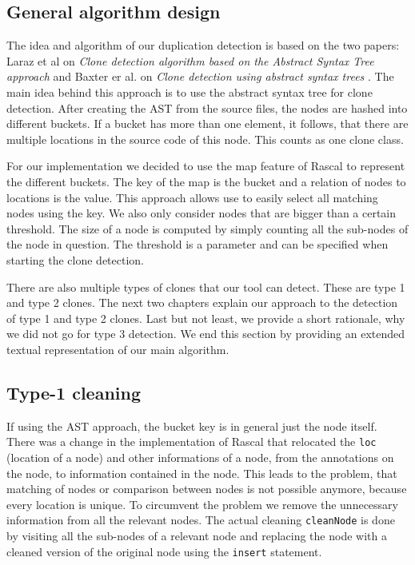 \documentclass{uva-inf-article}
\begin{document}
\subsection{General algorithm design}

The idea and algorithm of our duplication detection is based on the two
papers: Laraz et al on \textit{Clone detection algorithm based on the Abstract Syntax Tree approach} \cite{lazar2014clone} and Baxter er al. on \textit{Clone detection using abstract syntax trees} \cite{baxter1998clone}. 
The main idea behind this approach is to use the abstract syntax tree for clone detection.
After creating the AST from the source files, the nodes are hashed into different buckets.
If a bucket has more than one element, it follows, that there are multiple locations in the source code of this node.
This counts as one clone class. 

For our implementation we decided to use the map feature of Rascal to represent the different buckets. The key of the map is the bucket and a relation of nodes to locations is the value. This approach allows use to easily select all matching nodes using the key.  We also only consider nodes that are bigger than a certain threshold. The size of a node is computed by simply counting all the sub-nodes of the node in question. The threshold is a parameter and can be specified when starting the clone detection.

There are also multiple types of clones that our tool can detect. These are type 1 and type 2 clones. The next two chapters explain our approach to the detection of type 1 and type 2 clones. Last but not least, we provide a short rationale, why we did not go for type 3 detection. We end this section by providing an extended textual representation of our main algorithm.

\subsection{Type-1 cleaning}\label{type1alg}

If using the AST approach, the bucket key is in general just the node itself. There was a change in the implementation of Rascal that relocated the \texttt{loc} (location of a node) and other informations of a node, from the annotations on the node, to information contained in the node. This leads to the problem, that matching of nodes or comparison between nodes is not possible anymore, because every location is unique. To circumvent the problem we remove the unnecessary information from all the relevant nodes. The actual cleaning \texttt{cleanNode} is done by visiting all the sub-nodes of a relevant node and replacing the node with a cleaned version of the original node using the \texttt{insert} statement.
\end{document}
